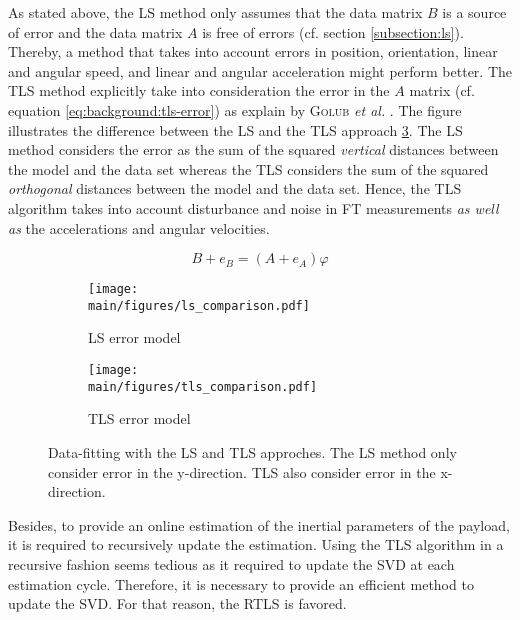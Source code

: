 \documentclass[/home/francois/latex/report/main.tex]{subfiles}
\begin{document}
As stated above, the \ac{LS} method only assumes that the data matrix $B$ is a source of error and the data matrix $A$ is free of errors (cf. section \ref{subsection:ls}). Thereby, a method that takes into account errors in position, orientation, linear and angular speed, and linear and angular acceleration might perform better. The \ac{TLS} method explicitly take into consideration the error in the $A$ matrix (cf. equation \ref{eq:background:tls-error}) as explain by \textsc{Golub} \textit{et al.} \cite{Golub1980}. The figure illustrates the difference between the \ac{LS} and the \ac{TLS} approach \ref{fig:background:ls-tls-error}. The \ac{LS} method considers the error as the sum of the squared \textit{vertical} distances between the model and the data set whereas the \ac{TLS} considers the sum of the squared \textit{orthogonal} distances between the model and the data set. Hence, the \ac{TLS} algorithm takes into account disturbance and noise in \ac{FT} measurements \textit{as well as} the accelerations and angular velocities.

\begin{equation}
  \label{eq:background:tls-error}
B + e_B = (A + e_A) \varphi
\end{equation}

\begin{figure}[h]
\centering
\begin{subfigure}{0.49\textwidth}
\centering
\texttt{[image: \\main/figures/ls\_comparison.pdf]}
\caption{\ac{LS} error model}
\label{fig:background:ls-error}
\end{subfigure}
\begin{subfigure}{0.49\textwidth}
\centering
\texttt{[image: \\main/figures/tls\_comparison.pdf]}
\caption{\ac{TLS} error model}
\label{fig:background:tls-error}
\end{subfigure}
\caption{Data-fitting with the \ac{LS} and \ac{TLS} approches. The \ac{LS} method only consider error in the y-direction. \ac{TLS} also consider error in the x-direction.}
\label{fig:background:ls-tls-error}
\end{figure}

Besides, to provide an online estimation of the inertial parameters of the payload, it is required to recursively update the estimation. Using the \ac{TLS} algorithm in a recursive fashion seems tedious as it required to update the \ac{SVD} at each estimation cycle. Therefore, it is necessary to provide an efficient method to update the \ac{SVD}. For that reason, the \ac{RTLS} is favored.
\end{document}
